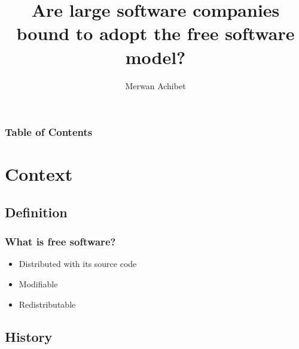 \documentclass{beamer}
\title{Are large software companies bound to adopt the free software model?}
\author{Merwan Achibet}
\institute{Université du Havre}
\date{}
\begin{document}
\maketitle

\begin{frame}
  \frametitle{Table of Contents}
  \tableofcontents
\end{frame}

\section{Context}

\subsection{Definition}

\begin{frame}

  \frametitle{What is free software?}

  \begin{itemize}
    \item<1->{Distributed with its source code}
    \item<2->{Modifiable}
    \item<3->{Redistributable}
  \end{itemize}

  \pause

  \vfill



\end{frame}

\subsection{History}
\end{document}
